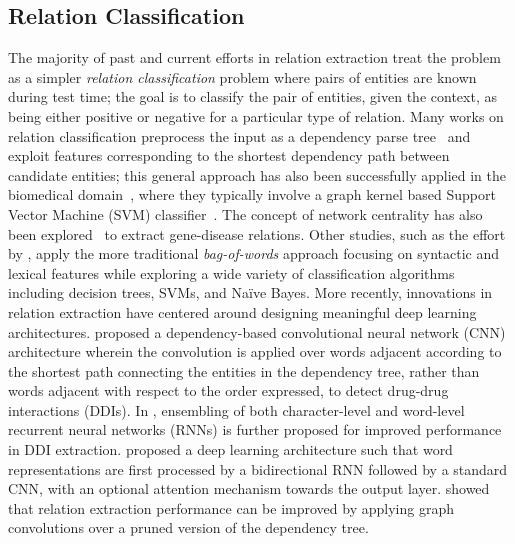 \documentclass{clv3}
\begin{document}
\subsection{Relation Classification} 
The majority of past and current efforts in relation extraction treat the problem as a simpler \emph{relation classification} problem where pairs of entities are known during test time; the goal is to classify the pair of entities, given the context, as being either positive or negative for a particular type of relation. Many works on relation classification preprocess the input as a dependency parse tree~\cite{bunescu2005shortest,qian2008exploiting} and exploit features corresponding to the shortest dependency path between candidate entities; this general approach has also been successfully applied in the biomedical domain~\cite{airola2008all,fundel2007relex,li2008kernel,ozgur2008identifying}, where they typically involve a graph kernel based Support Vector Machine (SVM) classifier~\cite{li2008kernel,rink2011automatic}. The concept of network centrality has also been explored~\cite{ozgur2008identifying} to extract gene-disease relations. Other studies, such as the effort by , apply the more traditional \emph{bag-of-words} approach focusing on syntactic and lexical features while exploring a wide variety of classification algorithms including decision trees, SVMs, and Na\"ive Bayes. More recently, innovations in relation extraction have centered around designing meaningful deep learning architectures.  proposed a dependency-based convolutional neural network (CNN) architecture wherein the convolution is applied over words adjacent according to the shortest path connecting the entities in the dependency tree, rather than words adjacent with respect to the order expressed, to detect drug-drug interactions (DDIs). In , ensembling of both character-level and word-level recurrent neural networks (RNNs) is further proposed for improved performance in DDI extraction.  proposed a deep learning architecture such that word representations are first processed by a bidirectional RNN followed by a standard CNN, with an optional attention mechanism towards the output layer.  showed that relation extraction performance can be improved by applying graph convolutions over a pruned version of the dependency tree.
\end{document}
